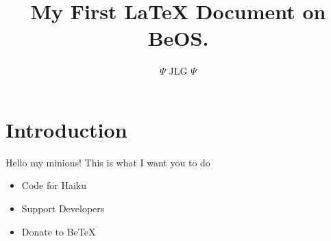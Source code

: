 \documentclass[a4paper,10pt]{article}
\author{$\Psi$ JLG $\Psi$}
\title{My First \LaTeX{} Document on BeOS.}
\begin{document}
\maketitle
\section{Introduction}
Hello my minions!
This is what I want you to do
\begin{itemize}
\item{Code for Haiku}
\item{Support Developers}
\item{Donate to BeTeX}
\end{itemize}
\end{document}
